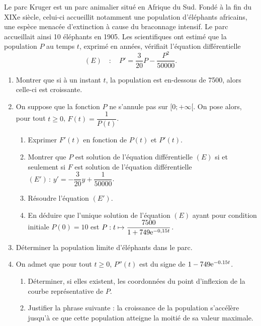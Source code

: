 \documentclass[11pt,fleqn, openany]{book} %
\begin{document}
\begin{exercise}[topic=diff04, subtitle={(Modèle de Verhulst)}]Le parc Kruger est un parc animalier situé en Afrique du Sud. Fondé à la fin du XIXe siècle, celui-ci accueillit notamment une population d'éléphants africains, une espèce menacée d'extinction à cause du braconnage intensif. 
Le parc accueillait ainsi 10 éléphants en 1905. Les scientifiques ont estimé que la population $P$ au temps $t$, exprimé en années, vérifiait l'équation différentielle
\[(E) \quad : \quad P' = \dfrac{3}{20}P - \dfrac{P^2}{50000}.\]

\begin{enumerate}
\item Montrer que si à un instant $t$, la population est en-dessous de 7500, alors celle-ci est croissante.
\item On suppose que la fonction $P$ ne s'annule pas sur $[0;+\infty [$. On pose alors, pour tout $t\geqslant 0$, $F(t)=\dfrac{1}{P(t)}$.
\begin{enumerate}
\item Exprimer $F'(t)$ en fonction de $P(t)$ et $P'(t)$.
\item Montrer que $P$ est solution de l'équation différentielle $(E)$ si et seulement si $F$ est solution de l'équation différentielle $(E') \, : \, y'=-\dfrac{3}{20}y + \dfrac{1}{50000}$.
\item Résoudre l'équation $(E')$.
\item En déduire que l'unique solution de l'équation $(E)$ ayant pour condition initiale $P(0)=10$ est $P : t \mapsto \dfrac{7500}{1+749\mathrm{e}^{-0,15t}}$.
\end{enumerate}
\item Déterminer la population limite d'éléphants dans le parc.
\item On admet que pour tout $t \geqslant 0$, $P''(t)$ est du signe de $1-749\mathrm{e}^{-0.15t}$. 
\begin{enumerate}
\item Déterminer, si elles existent, les coordonnées du point d'inflexion de la courbe représentative de $P$.
\item Justifier la phrase suivante : la croissance de la population s'accélère jusqu'à ce que cette population atteigne la moitié de sa valeur maximale.
\end{enumerate}
\end{enumerate}\newpage \end{exercise}
\end{document}
